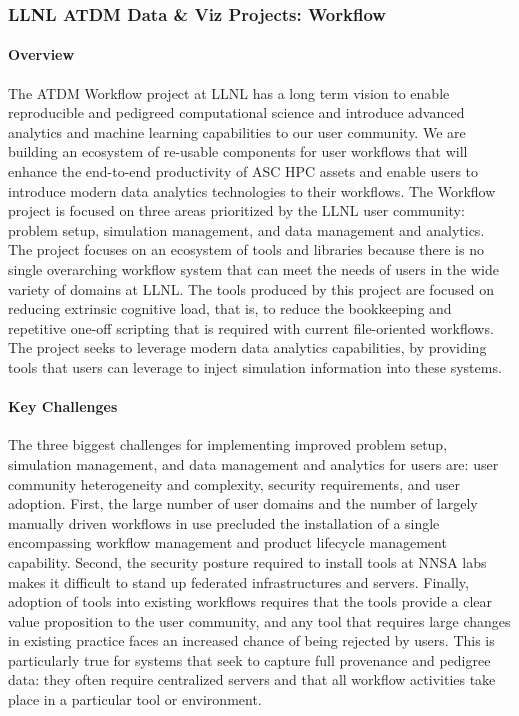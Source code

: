 \subsubsection{LLNL ATDM Data \& Viz Projects: Workflow}

\paragraph{Overview} 

The ATDM Workflow project at LLNL has a long term vision to enable reproducible
and pedigreed computational science and introduce advanced analytics and machine
learning capabilities to our user community. We are building an
ecosystem of re-usable components for user workflows that will enhance the
end-to-end productivity of ASC HPC assets and enable users to introduce modern
data analytics technologies to their workflows. The Workflow project is focused
on three areas prioritized by the LLNL user community: problem setup, simulation
management, and data management and analytics. The project focuses on an
ecosystem of tools and libraries because there is no single overarching
workflow system that can meet the needs of users in the wide variety of domains
at LLNL. The tools produced by this project are focused on reducing extrinsic
cognitive load, that is, to reduce the bookkeeping and repetitive one-off
scripting that is required with current file-oriented workflows. The project
seeks to leverage modern data analytics capabilities, by providing tools that
users can leverage to inject simulation information into these systems. 

\paragraph{Key Challenges}

The three biggest challenges for implementing improved problem setup,
simulation management, and data management and analytics for users are: user
community heterogeneity and complexity, security requirements, and user
adoption. First, the large number of user domains and the number of largely
manually driven workflows in use precluded the installation of a single
encompassing workflow management and product lifecycle management capability.
Second, the security posture required to install tools at NNSA labs makes it
difficult to stand up federated infrastructures and servers.  Finally, adoption
of tools into existing workflows requires that the tools provide a clear value
proposition to the user community, and any tool that requires large changes in
existing practice faces an increased chance of being rejected by users. This is
particularly true for systems that seek to capture full provenance and pedigree
data: they often require centralized servers and that all workflow activities
take place in a particular tool or environment.

